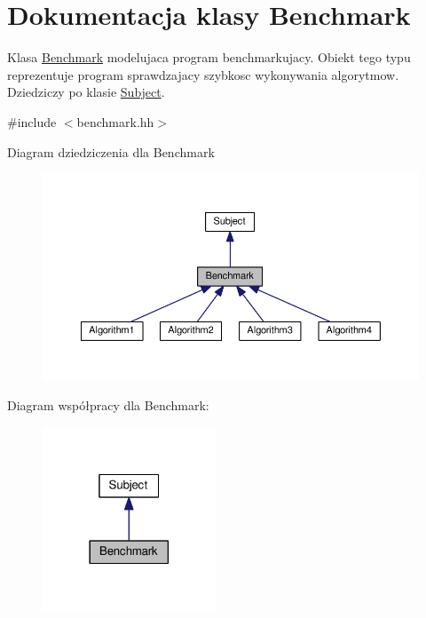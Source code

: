 \hypertarget{class_benchmark}{\section{Dokumentacja klasy Benchmark}
\label{class_benchmark}
}


Klasa \hyperlink{class_benchmark}{Benchmark} modelujaca program benchmarkujacy. Obiekt tego typu reprezentuje program sprawdzajacy szybkosc wykonywania algorytmow. Dziedziczy po klasie \hyperlink{class_subject}{Subject}.  




{\ttfamily \#include $<$benchmark.\-hh$>$}



Diagram dziedziczenia dla Benchmark\nopagebreak
\begin{figure}[H]
\begin{center}
\leavevmode
\includegraphics[width=350pt]{class_benchmark__inherit__graph}
\end{center}
\end{figure}


Diagram współpracy dla Benchmark\-:\nopagebreak
\begin{figure}[H]
\begin{center}
\leavevmode
\includegraphics[width=146pt]{class_benchmark__coll__graph}
\end{center}
\end{figure}
